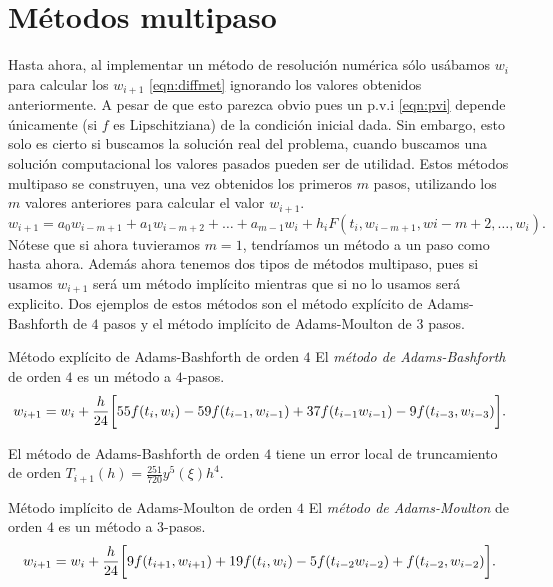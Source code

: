 \section{Métodos multipaso}

Hasta ahora, al implementar un método de resolución numérica sólo usábamos
$w_i$ para calcular los $w_{i+1}$ \eqref{eqn:diffmet}
ignorando los valores obtenidos anteriormente.
A pesar de que esto parezca obvio pues un p.v.i \eqref{eqn:pvi}
depende únicamente (si $f$ es Lipschitziana) de la condición inicial dada.
Sin embargo, esto solo es cierto si buscamos la solución real del problema,
cuando buscamos una solución computacional
los valores pasados pueden ser de utilidad.
Estos métodos multipaso se construyen, una vez obtenidos los primeros $m$ pasos,
utilizando los $m$ valores anteriores para calcular el valor $w_{i+1}$.
\begin{equation*}
    w_{i+1} = a_0w_{i-m+1} + a_1w_{i-m+2} + \dots + a_{m-1}w_i
        + h_iF(t_i,w_{i-m+1},w{i-m+2},\dots,w_i).
\end{equation*}
Nótese que si ahora tuvieramos $m = 1$,
tendríamos un método a un paso como hasta ahora.
Además ahora tenemos dos tipos de métodos multipaso, pues si usamos $w_{i+1}$
será um método implícito mientras que si no lo usamos será explicito.
Dos ejemplos de estos métodos son
el método explícito de Adams-Bashforth de $4$ pasos
y el método implícito de Adams-Moulton de $3$ pasos.

\begin{method}{Método explícito de Adams-Bashforth de orden $4$}
    El \emph{método de Adams-Bashforth} de orden $4$
    es un método a $4$-pasos.
    \begin{equation}\label{eqn:AB4steps}
        w_{i+1} = w_i + \frac{h}{24}\qty\bigg[
            55f(t_i,w_i) - 59f(t_{i-1},w_{i-1})
            + 37f(t_{i-1}w_{i-1}) - 9f(t_{i-3},w_{i-3})
        ].
    \end{equation}
\end{method}

\begin{proposition}
    El método de Adams-Bashforth de orden $4$
    tiene un error local de truncamiento
    de orden $T_{i+1}(h) = \frac{251}{720}y^5(\xi)h^4$.
\end{proposition}

\begin{method}{Método implícito de Adams-Moulton de orden $4$}
    El \emph{método de Adams-Moulton} de orden $4$
    es un método a $3$-pasos.
    \begin{equation}\label{eqn:AM3steps}
        w_{i+1} = w_i + \frac{h}{24}\qty\bigg[
            9f(t_{i+1},w_{i+1}) + 19f(t_i,w_i)
            - 5f(t_{i-2}w_{i-2}) + f(t_{i-2},w_{i-2})
        ].
    \end{equation}
\end{method}

